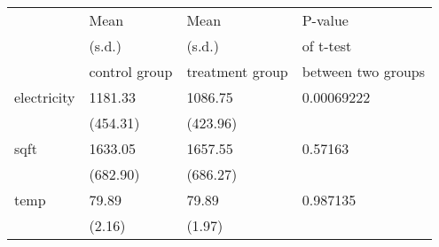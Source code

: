 \begin{tabular}{llll}
\toprule
{} &          Mean &           Mean  &           P-value  \\
{} &        (s.d.) &          (s.d.) &          of t-test \\
{} & control group & treatment group & between two groups \\
\midrule
electricity &       1181.33 &         1086.75 &         0.00069222 \\
            &      (454.31) &        (423.96) &                    \\
sqft        &       1633.05 &         1657.55 &            0.57163 \\
            &      (682.90) &        (686.27) &                    \\
temp        &         79.89 &           79.89 &           0.987135 \\
            &        (2.16) &          (1.97) &                    \\
\bottomrule
\end{tabular}
